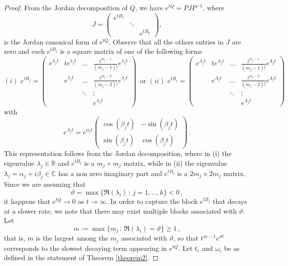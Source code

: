 \documentclass[10pt,a4paper]{amsart}
\begin{document}
\begin{proof} From the Jordan decomposition of $Q$, we have  $e^{tQ}=PJP^{-1}$, where
	$$J=\begin{pmatrix}
		e^{tB_1}& & \\ 
		&\ddots &  \\
		& & e^{tB_p} 
	\end{pmatrix},$$
	is the Jordan canonical form of $e^{tQ}$. Observe that all the others entries in $J$ are zero and each $e^{tB_j}$ is a square matrix of one of the following forms
	\begin{equation}\label{eq:Jordan}
		(i)\,\, e^{tB_j}=\begin{pmatrix}
			e^{\lambda_j t}&te^{\lambda_j t}&\dots&\frac{t^{m_j-1}}{(m_j-1)!}e^{\lambda_j t}\\ 
			&e^{\lambda_j t}&\dots&\frac{t^{m_j-2}}{(m_j-2)!}e^{\lambda_j t}\\
			& &\ddots & \vdots \\
			& & & e^{\lambda_j t } 
		\end{pmatrix}\,\mbox{ or } (ii)\,\, e^{tB_j}=\begin{pmatrix}e^{\Lambda_j t}&te^{\Lambda_j t}&\dots&\frac{t^{m_j-1}}{(m_j-1)!}e^{\Lambda_j t}\\ 
			&e^{\Lambda_j t}&\dots&\frac{t^{m_j-2}}{(m_j-2)!}e^{\Lambda_j t}\\
			& &\ddots & \vdots \\
			& & & e^{\Lambda_j t }\end{pmatrix}
	\end{equation}
	with 
	$$e^{\Lambda_j t}=e^{\alpha_jt} \begin{pmatrix}\cos\left(\beta_j t\right)&-\sin\left(\beta_j t\right)\\
		\sin\left(\beta_j t\right)& \cos\left(\beta_j t\right)\end{pmatrix}\,.$$
	This representation follows from the Jordan decomposition, where in (i) the eigenvalue $\lambda_j\in\mathbb{R}$ and $e^{tB_j}$ is a $m_j\times m_j$ matrix,  while in (ii) the eigenvalue $\lambda_j=\alpha_j+i\beta_j\in\mathbb{C}$ has a non zero imaginary part and $e^{tB_j}$ is a $2m_j\times 2m_j$ matrix. Since we are assuming that 
	\[
	\vartheta=\max \{ \Re(\lambda_i)\,:\,j=1,\dots,k \} <0\,,
	\] 
	it happens that $e^{tQ}\to 0$ as $t\to\infty$. In order to capture the block $e^{tB_j}$
	that decays at a slower rate, we note that there may exist multiple blocks associated with 
	$\vartheta$.  Let
	$$m:=\max\{m_j\,:\,\Re(\lambda_i)=\vartheta\}\geq 1\,, $$ 
	that is, $m$ is the largest among the $m_j$ associated with $\vartheta$, so that $t^{m-1}e^{\vartheta t}$  corresponds to the slowest decaying term appearing in $e^{tQ}$. Let  $t_\epsilon$  and  $\omega_\epsilon$ be as defined  in the statement of Theorem \ref{theorem2}.

\end{proof}
\end{document}
